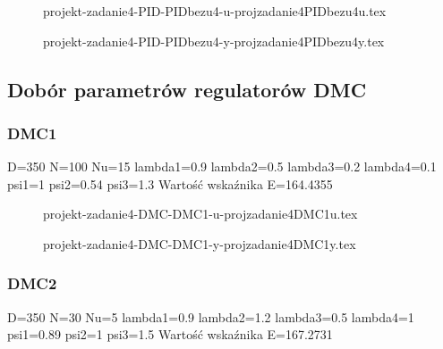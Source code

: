 \ifdefined\CompileFigures
    \begin{figure}[H] 
        \centering
        
        \caption{projekt-zadanie4-PID-PIDbezu4-u-projzadanie4PIDbezu4u.tex}
        \label{projekt:zad4:figure:projzadanie4PIDbezu4u}
    \end{figure}
\fi

\ifdefined\CompileFigures
    \begin{figure}[H] 
        \centering
        
        \caption{projekt-zadanie4-PID-PIDbezu4-y-projzadanie4PIDbezu4y.tex}
        \label{projekt:zad4:figure:projzadanie4PIDbezu4y}
    \end{figure}
\fi

\subsection{Dobór parametrów regulatorów DMC}


\subsubsection{DMC1}
D=350 N=100 Nu=15 lambda1=0.9 lambda2=0.5 lambda3=0.2 lambda4=0.1
psi1=1 psi2=0.54 psi3=1.3
Wartość wskaźnika E=164.4355

\ifdefined\CompileFigures
    \begin{figure}[H] 
        \centering
        
        \caption{projekt-zadanie4-DMC-DMC1-u-projzadanie4DMC1u.tex}
        \label{projekt:zad4:figure:projzadanie4DMC1u}
    \end{figure}
\fi

\ifdefined\CompileFigures
    \begin{figure}[H] 
        \centering
        
        \caption{projekt-zadanie4-DMC-DMC1-y-projzadanie4DMC1y.tex}
        \label{projekt:zad4:figure:projzadanie4DMC1y}
    \end{figure}
\fi

\subsubsection{DMC2}
D=350 N=30 Nu=5 lambda1=0.9 lambda2=1.2 lambda3=0.5 lambda4=1
psi1=0.89 psi2=1 psi3=1.5
Wartość wskaźnika E=167.2731

